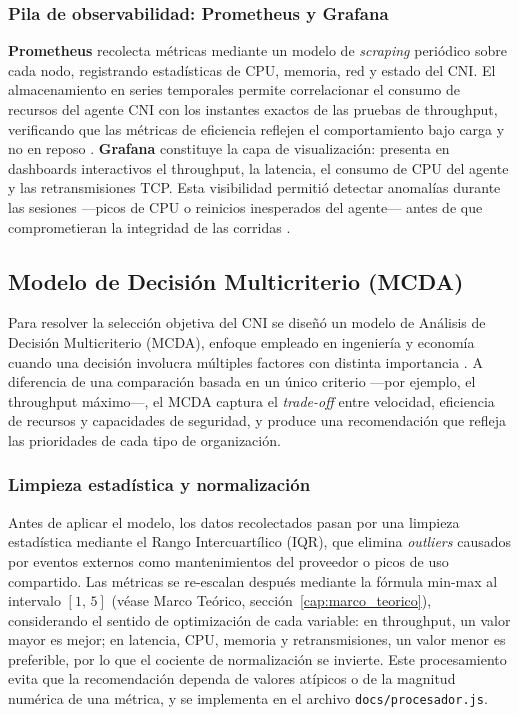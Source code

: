 \subsubsection{Pila de observabilidad: Prometheus y Grafana}

\textbf{Prometheus} recolecta métricas mediante un modelo de \emph{scraping} periódico sobre cada nodo, registrando estadísticas de CPU, memoria, red y estado del CNI. El almacenamiento en series temporales permite correlacionar el consumo de recursos del agente CNI con los instantes exactos de las pruebas de throughput, verificando que las métricas de eficiencia reflejen el comportamiento bajo carga y no en reposo \cite{ref6}. \textbf{Grafana} constituye la capa de visualización: presenta en dashboards interactivos el throughput, la latencia, el consumo de CPU del agente y las retransmisiones TCP. Esta visibilidad permitió detectar anomalías durante las sesiones ---picos de CPU o reinicios inesperados del agente--- antes de que comprometieran la integridad de las corridas \cite{ref6}.

\subsection{Modelo de Decisión Multicriterio (MCDA)}

Para resolver la selección objetiva del CNI se diseñó un modelo de Análisis de Decisión Multicriterio (MCDA), enfoque empleado en ingeniería y economía cuando una decisión involucra múltiples factores con distinta importancia \cite{ref34}. A diferencia de una comparación basada en un único criterio ---por ejemplo, el throughput máximo---, el MCDA captura el \emph{trade-off} entre velocidad, eficiencia de recursos y capacidades de seguridad, y produce una recomendación que refleja las prioridades de cada tipo de organización.

\subsubsection{Limpieza estadística y normalización}

Antes de aplicar el modelo, los datos recolectados pasan por una limpieza estadística mediante el Rango Intercuartílico (IQR), que elimina \emph{outliers} causados por eventos externos como mantenimientos del proveedor o picos de uso compartido. Las métricas se re-escalan después mediante la fórmula min-max al intervalo $[1,\,5]$ (véase Marco Teórico, sección~\ref{cap:marco_teorico}), considerando el sentido de optimización de cada variable: en throughput, un valor mayor es mejor; en latencia, CPU, memoria y retransmisiones, un valor menor es preferible, por lo que el cociente de normalización se invierte. Este procesamiento evita que la recomendación dependa de valores atípicos o de la magnitud numérica de una métrica, y se implementa en el archivo \texttt{docs/procesador.js}.

